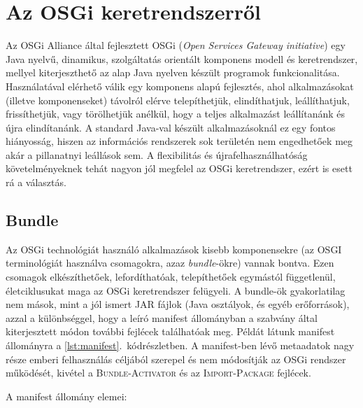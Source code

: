\chapter{Az OSGi keretrendszerről}
\label{cha:osgi}

Az OSGi Alliance \cite{osgi} által fejlesztett OSGi (\textit{Open Services Gateway initiative}) egy Java nyelvű, dinamikus, szolgáltatás orientált komponens modell és keretrendszer, mellyel kiterjeszthető az alap Java nyelven készült programok funkcionalitása. Használatával elérhető válik egy komponens alapú fejlesztés, ahol alkalmazásokat (illetve komponenseket) távolról elérve telepíthetjük, elindíthatjuk, leállíthatjuk, frissíthetjük, vagy törölhetjük anélkül, hogy a teljes alkalmazást leállítanánk és újra elindítanánk. A standard Java-val készült alkalmazásoknál ez egy fontos hiányosság, hiszen az információs rendszerek sok területén nem engedhetőek meg akár a pillanatnyi leállások sem. A flexibilitás és újrafelhasználhatóság követelményeknek tehát nagyon jól megfelel az OSGi keretrendszer, ezért is esett rá a választás.

\section{Bundle}
\label{sec:bundle}

Az OSGi technológiát \cite{osgiintro} használó alkalmazások kisebb komponensekre (az OSGI terminológiát használva csomagokra, azaz \textit{bundle}-ökre) vannak bontva. Ezen csomagok elkészíthetőek, lefordíthatóak, telepíthetőek egymástól függetlenül, életciklusukat maga az OSGi keretrendszer felügyeli. A bundle-ök gyakorlatilag nem mások, mint a jól ismert JAR fájlok (Java osztályok, és egyéb erőforrások), azzal a különbséggel, hogy a leíró manifest állományban a szabvány által kiterjesztett módon további fejlécek találhatóak meg. Példát látunk manifest állományra a \ref{lst:manifest}.~kódrészletben. A manifest-ben lévő metaadatok nagy része emberi felhasználás céljából szerepel és nem módosítják az OSGi rendszer működését, kivétel a \textsc{Bundle-Activator} és az \textsc{Import-Package} fejlécek.

A manifest állomány elemei:

